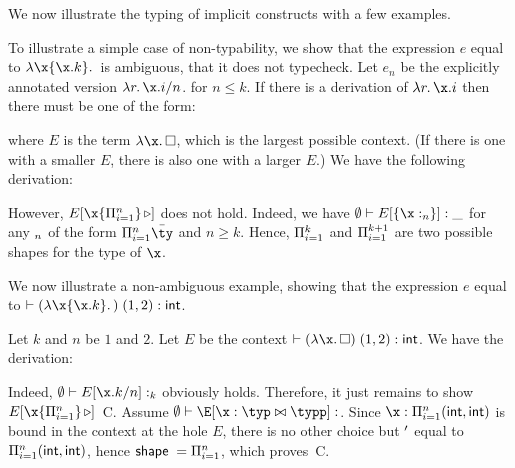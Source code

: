 \documentclass[acmsmall,screen,nonacm]{acmart}
\begin{document}
We now illustrate the typing of implicit constructs with a few examples.
\begin{example}
To illustrate a simple case of non-typability, we show that the expression $e$
equal to $\efun \x {\eproj \x k}$ is ambiguous, \ie that it does not
typecheck.
%
Let $e_n$ be the explicitly annotated version $\efun r
{\eproj[n] \x i}$. for $n \le k$.  If there is a derivation of $\efun r
{\eproj \x i}$ then there must be one of the form:
\begin{mathpar}
\end{mathpar}
where $E$ is the term $\efun \x \ehole$, which is the largest possible
context. (If there is one with a smaller $E$, there is also one with a
larger $E$.)
%
We have  the following derivation:
\begin{mathpar}
\end{mathpar}
However, $\eshape E  \x {\Pi\iton}$ does not hold.
Indeed, we have $\eset \th E \where {\emagic {\x :\t_n}} : \wild$
for any $\t_n$ of the form $\Pi\iton \tys$ and $n \ge k$.
Hence, $\Pi\iton[k]$ and $\Pi\iton[k+1]$ are two possible shapes
for the type of $\x$.
\end{example}

\begin{example}
\locallabelreset
We now illustrate a non-ambiguous example, showing that the
expression $e$ equal to $\th \eapp {(\efun \x {\eproj
\x  k})} {(1, 2)} : \tint$.

Let $k$ and $n$ be $1$ and $2$.
Let $E$ be the context $\th \eapp {(\efun \x \ehole)} {(1, 2)} : \tint$.  We
have the derivation:
\begin{mathpar}
\end{mathpar}
Indeed, $\eset \th E \where {\eproj[n] \x k} : \t_k$ obviously holds.
Therefore, it just remains to show $\eshape E \x {\Pi\iton}$~\llabel C.
Assume $\eset \th \E \where{\ecast \x \typ \typp} : \t$. Since
$\x: \Pi\iton (\tint,\tint)$ is bound in the context at the hole $E$,
there is no other choice but $\tp$ equal to $\Pi\iton (\tint,\tint)$,
hence $\tshape \t = \Pi\iton$, which proves~\lref C.
\end{example}
\end{document}
